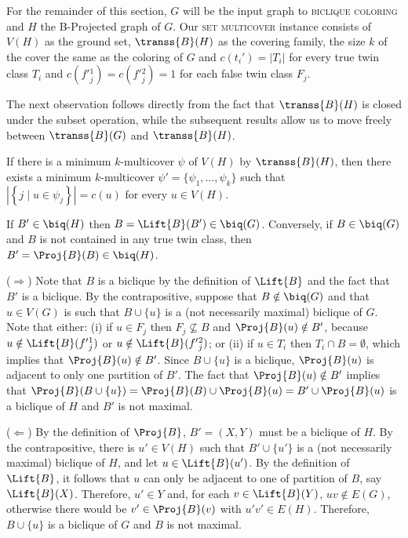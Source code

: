 For the remainder of this section, $G$ will be the input graph to \textsc{biclique coloring} and $H$ the B-Projected graph of $G$.
Our \textsc{set multicover} instance consists of $V(H)$ as the ground set, $\transs{B}(H)$ as the covering family, the size $k$ of the cover the same as the coloring of $G$ and $c(t_i') = |T_i|$ for every true twin class $T_i$ and $c(f'{_j^1}) = c(f'{_j^2}) = 1$ for each false twin class $F_j$.

The next observation follows directly from the fact that $\transs{B}(H)$ is closed under the subset operation, while the subsequent results allow us to move freely between $\transs{B}(G)$ and $\transs{B}(H)$.

\begin{observation}
    \label{obs:fatless_multicover}
    If there is a minimum $k$-multicover $\psi$ of $V(H)$ by $\transs{B}(H)$, then there exists a minimum $k$-multicover $\psi' = \{\psi_1, \dots, \psi_k\}$ such that $\left|\left\{j \mid u \in \psi_j\right\}\right| = c(u)$ for every $u \in V(H)$.
\end{observation}

\begin{lemma}
    \label{lem:lift_proj_biclique}
    If $B' \in \biq(H)$ then $B = \Lift{B}(B') \in \biq(G)$. Conversely, if $B \in \biq(G)$ and $B$ is not contained in any true twin class, then $B' = \Proj{B}(B) \in \biq(H)$.
\end{lemma}

\begin{tproof}
    ($\Rightarrow$) Note that $B$ is a biclique by the definition of $\Lift{B}$ and the fact that $B'$ is a biclique. By the contrapositive, suppose that $B \notin \biq(G)$ and that $u \in V(G)$ is such that $B \cup \{u\}$ is a (not necessarily maximal) biclique of $G$. Note that either:
    (i) if $u \in F_j$ then $F_j \nsubseteq B$ and $\Proj{B}(u) \notin B'$, because $u \notin \Lift{B}(f'{_j^1})$ or $u \notin \Lift{B}(f'{_j^2})$;
    or (ii) if $u \in T_i$ then $T_i \cap B = \emptyset$, which implies that $\Proj{B}(u) \notin B'$.
    Since $B \cup \{u\}$ is a biclique, $\Proj{B}(u)$ is adjacent to only one partition of $B'$.
    The fact that $\Proj{B}(u) \notin B'$ implies that $\Proj{B}(B \cup \{u\}) = \Proj{B}(B) \cup \Proj{B}(u) = B' \cup \Proj{B}(u)$ is a biclique of $H$ and $B'$ is not maximal.
    
    ($\Leftarrow$) By the definition of $\Proj{B}$, $B' = (X, Y)$ must be a biclique of $H$. By the contrapositive, there is $u' \in V(H)$ such that $B' \cup \{u'\}$ is a (not necessarily maximal) biclique of $H$, and let $u \in \Lift{B}(u')$. By the definition of $\Lift{B}$, it follows that $u$ can only be adjacent to one of partition of $B$, say $\Lift{B}(X)$. Therefore, $u' \in Y$ and, for each $v \in \Lift{B}(Y)$, $uv \notin E(G)$, otherwise there would be $v' \in \Proj{B}(v)$ with $u'v' \in E(H)$. Therefore, $B \cup \{u\}$ is a biclique of $G$ and $B$ is not maximal.
\end{tproof}


